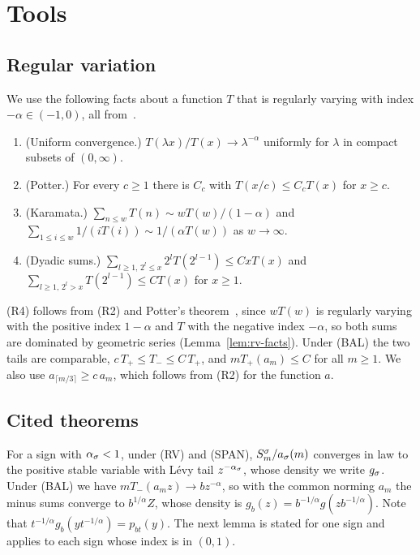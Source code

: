 \section{Tools}\label{sec:tools}

\subsection{Regular variation}\label{sec:rv}

We use the following facts about a function $T$ that is regularly varying with
index $-\alpha\in(-1,0)$, all from~\cite[Sections~1.2 to~1.5]{bgt1989}.
\begin{enumerate}[(R1)]
\item (Uniform convergence.) $T(\lambda x)/T(x)\to\lambda^{-\alpha}$ uniformly for
$\lambda$ in compact subsets of $(0,\infty)$.
\item (Potter.) For every $c\ge1$ there is $C_c$ with $T(x/c)\le C_cT(x)$ for $x\ge c$.
\item (Karamata.) $\sum_{n\le w}T(n)\sim wT(w)/(1-\alpha)$ and
$\sum_{1\le i\le w}1/(iT(i))\sim1/(\alpha T(w))$ as $w\to\infty$.
\item (Dyadic sums.) $\sum_{l\ge1,\,2^l\le x}2^lT(2^{l-1})\le CxT(x)$ and
$\sum_{l\ge1,\,2^l>x}T(2^{l-1})\le CT(x)$ for $x\ge1$.
\end{enumerate}
(R4) follows from (R2) and Potter's theorem~\cite[Theorem~1.5.6]{bgt1989}, since
$wT(w)$ is regularly varying with the positive index $1-\alpha$ and $T$ with the
negative index $-\alpha$, so both sums are dominated by geometric series
(Lemma~\ref{lem:rv-facts}). Under (BAL) the two tails are comparable,
$c\,T_\plus\le T_\minus\le C\,T_\plus$, and $mT_\plus(a_m)\le C$ for all $m\ge1$. We
also use $a_{\lceil m/3\rceil}\ge c\,a_m$, which follows from (R2) for the function
$a$.

\subsection{Cited theorems}\label{sec:cited}

For a sign with $\alpha_\sigma<1$, under (RV) and (SPAN), $S^\sigma_m/a_\sigma(m)$ converges in law to
the positive stable variable with L\'evy tail $z^{-\alpha_\sigma}$, whose density we write
$g_\sigma$. Under (BAL) we have $mT_\minus(a_mz)\to bz^{-\alpha}$, so with the common norming $a_m$
the minus sums converge to $b^{1/\alpha}Z$, whose density is
$g_b(z)=b^{-1/\alpha}g(zb^{-1/\alpha})$. Note that $t^{-1/\alpha}g_b(yt^{-1/\alpha})=p_{bt}(y)$.
The next lemma is stated for one sign and applies to each sign whose index is in
$(0,1)$.

